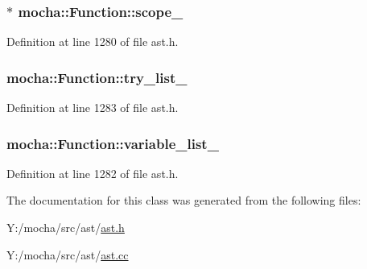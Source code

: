 \hypertarget{classmocha_1_1_function_aa72c922f8808342eaad6b06d49a8757c}{
\subsubsection[{scope\_\-}]{$\ast$ {\bf mocha::Function::scope\_\-}}}
\label{classmocha_1_1_function_aa72c922f8808342eaad6b06d49a8757c}


Definition at line 1280 of file ast.h.

\hypertarget{classmocha_1_1_function_a3adc54c775dcb9470a3d2ecabcd679f0}{
\subsubsection[{try\_\-list\_\-}]{ {\bf mocha::Function::try\_\-list\_\-}}}
\label{classmocha_1_1_function_a3adc54c775dcb9470a3d2ecabcd679f0}


Definition at line 1283 of file ast.h.

\hypertarget{classmocha_1_1_function_af7dd9ddfa47f825f6ac37eca4648c4eb}{
\subsubsection[{variable\_\-list\_\-}]{ {\bf mocha::Function::variable\_\-list\_\-}}}
\label{classmocha_1_1_function_af7dd9ddfa47f825f6ac37eca4648c4eb}


Definition at line 1282 of file ast.h.



The documentation for this class was generated from the following files:\begin{DoxyCompactItemize}
\item 
Y:/mocha/src/ast/\hyperlink{ast_8h}{ast.h}\item 
Y:/mocha/src/ast/\hyperlink{ast_8cc}{ast.cc}\end{DoxyCompactItemize}
